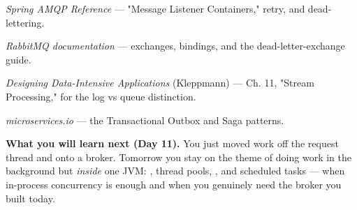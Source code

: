 \begin{iqbox}
\end{iqbox}

\begin{wbitem}
  \item \emph{Spring AMQP Reference} --- "Message Listener Containers," retry, and dead-lettering.
  \item \emph{RabbitMQ documentation} --- exchanges, bindings, and the dead-letter-exchange guide.
  \item \emph{Designing Data-Intensive Applications} (Kleppmann) --- Ch. 11, "Stream Processing," for the log vs queue distinction.
  \item \emph{microservices.io} --- the Transactional Outbox and Saga patterns.
\end{wbitem}

\begin{keyidea}
\textbf{What you will learn next (Day 11).} You just moved work off the request thread and onto a broker. Tomorrow you stay on the theme of doing work in the background but \emph{inside} one JVM: , thread pools, , and scheduled tasks --- when in-process concurrency is enough and when you genuinely need the broker you built today.
\end{keyidea}

